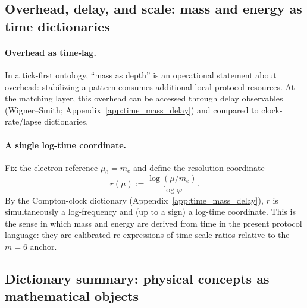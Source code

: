 \subsection{Overhead, delay, and scale: mass and energy as time dictionaries}
\label{subsec:tick_to_mass_energy}

\paragraph{Overhead as time-lag.}
In a tick-first ontology, ``mass as depth'' is an operational statement about overhead: stabilizing a pattern consumes additional local protocol resources.
At the matching layer, this overhead can be accessed through delay observables (Wigner--Smith; Appendix~\ref{app:time_mass_delay}) and compared to clock-rate/lapse dictionaries.

\paragraph{A single log-time coordinate.}
Fix the electron reference $\mu_0=m_e$ and define the resolution coordinate
\[
r(\mu):=\frac{\log(\mu/m_e)}{\log\varphi}.
\]
By the Compton-clock dictionary (Appendix~\ref{app:time_mass_delay}), $r$ is simultaneously a log-frequency and (up to a sign) a log-time coordinate.
This is the sense in which mass and energy are derived from time in the present protocol language: they are calibrated re-expressions of time-scale ratios relative to the $m=6$ anchor.

\subsection{Dictionary summary: physical concepts as mathematical objects}
\label{subsec:tick_dictionary_summary}


